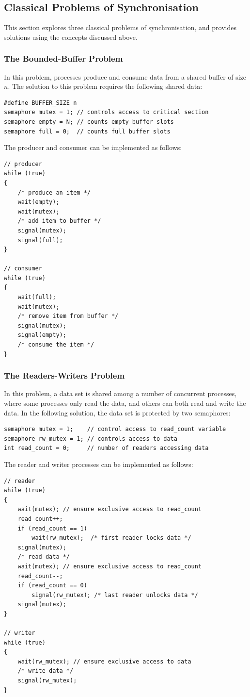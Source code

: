 \documentclass{article}
\begin{document}
\subsection{Classical Problems of Synchronisation}
This section explores three classical problems of synchronisation, and
provides solutions using the concepts discussed above.
\subsubsection{The Bounded-Buffer Problem}
In this problem, processes produce and consume data from a shared
buffer of size \(n\). The solution to this problem requires the
following shared data:
\begin{verbatim}
#define BUFFER_SIZE n
semaphore mutex = 1; // controls access to critical section
semaphore empty = N; // counts empty buffer slots
semaphore full = 0;  // counts full buffer slots
\end{verbatim}
The producer and consumer can be implemented as follows:
\begin{verbatim}
// producer
while (true)
{
    /* produce an item */
    wait(empty);
    wait(mutex);
    /* add item to buffer */
    signal(mutex);
    signal(full);
}

// consumer
while (true)
{
    wait(full);
    wait(mutex);
    /* remove item from buffer */
    signal(mutex);
    signal(empty);
    /* consume the item */
}
\end{verbatim}
\subsubsection{The Readers-Writers Problem}
In this problem, a data set is shared among a number of concurrent
processes, where some processes only read the data, and others can both
read and write the data. In the following solution, the data set is
protected by two semaphores:
\begin{verbatim}
semaphore mutex = 1;    // control access to read_count variable
semaphore rw_mutex = 1; // controls access to data
int read_count = 0;     // number of readers accessing data
\end{verbatim}
The reader and writer processes can be implemented as follows:
\begin{verbatim}
// reader
while (true)
{
    wait(mutex); // ensure exclusive access to read_count
    read_count++;
    if (read_count == 1)
        wait(rw_mutex);  /* first reader locks data */
    signal(mutex);
    /* read data */
    wait(mutex); // ensure exclusive access to read_count
    read_count--;
    if (read_count == 0)
        signal(rw_mutex); /* last reader unlocks data */
    signal(mutex);
}

// writer
while (true)
{
    wait(rw_mutex); // ensure exclusive access to data
    /* write data */
    signal(rw_mutex);
}
\end{verbatim}
\end{document}

